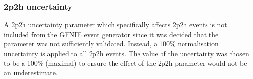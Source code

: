 \newpage
\subsubsection*{2p2h uncertainty}\label{sec:MEC_uncertainty}
A \gls{2p2h} uncertainty parameter which specifically affects \gls{2p2h} events is not included from the GENIE event generator since it was decided that the parameter was not sufficiently validated. Instead, a 100\% normalisation uncertainty is applied to all \gls{2p2h} events. The value of the uncertainty was chosen to be a 100\% (maximal) to ensure the effect of the \gls{2p2h} parameter would not be an underestimate. 



\clearpage

